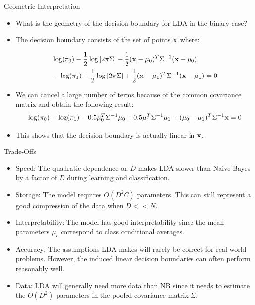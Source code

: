 \documentclass[serif,xcolor=pdftex,dvipsnames,table,hyperref={bookmarks=false}]{beamer}
\begin{document}
\begin{frame}[t]{Geometric Interpretation}

\begin{itemize}
\setlength{\itemsep}{12pt}
\item What is the geometry of the decision boundary for LDA in the binary case?

\pause\item The decision boundary consists of the set of points ${\mathbf{x}}$ where:

\begin{align*}
&\log(\pi_0) -\frac{1}{2}\log|2\pi\Sigma| - \frac{1}{2}({\mathbf{x}}-\mu_0)^T\Sigma^{-1}({\mathbf{x}}-\mu_0)\\
&-\log(\pi_1) + \frac{1}{2}\log|2\pi\Sigma| +\frac{1}{2}({\mathbf{x}}-\mu_1)^T\Sigma^{-1}({\mathbf{x}}-\mu_1)=0
\end{align*}

\pause\item We can cancel a large number of terms because of the common covariance matrix and obtain the following result:
$$\log(\pi_0) -\log(\pi_1) - 0.5\mu_0^T\Sigma^{-1}\mu_0 + 0.5\mu_1^T\Sigma^{-1}\mu_1 +  (\mu_0-\mu_1)^T\Sigma^{-1}{\mathbf{x}}=0$$

\pause\item This shows that the decision boundary is actually linear in ${\mathbf{x}}$.
\end{itemize}
\end{frame}

\begin{frame}[t]{Trade-Offs}

\begin{itemize}
\setlength{\itemsep}{6pt}
\item Speed: The quadratic dependence on $D$ makes LDA slower than Naive Bayes by a factor of $D$ during learning and classification.

\pause \item Storage: The model requires $O(D^2C)$ parameters. This can still represent a good compression of the data when $D<<N$.

\pause \item Interpretability: The model has good interpretability since the mean parameters $\mu_c$ correspond to class conditional averages.

\pause \item Accuracy: The assumptions LDA makes will rarely be correct for real-world problems. However, the induced linear decision boundaries can often perform reasonably well.

\pause \item Data: LDA will generally need more data than NB since it needs to estimate the $O(D^2)$ parameters in the pooled covariance matrix $\Sigma$.

\end{itemize}
\end{frame}
\end{document}
